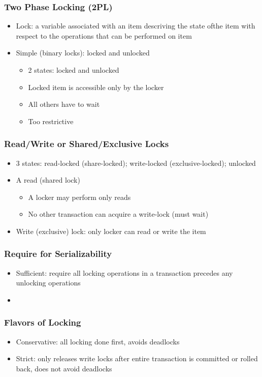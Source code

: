 \documentclass[12pt]{article}
\begin{document}
		\subsubsection*{Two Phase Locking (2PL)}
		\begin{itemize}
			\item
				Lock: a variable associated with an item descriving the state ofthe item with respect to the operations that can be performed on item
			\item
				Simple (binary locks): locked and unlocked
				\begin{itemize}
					\item
						2 states: locked and unlocked
					\item
						Locked item is accessible only by the locker
					\item
						All others have to wait
					\item
						Too restrictive
				\end{itemize}
		\end{itemize}
		\subsubsection*{Read/Write or Shared/Exclusive Locks}
		\begin{itemize}
			\item
				3 states: read-locked (share-locked); write-locked (exclusive-locked); unlocked
			\item
				A read (shared lock)
				\begin{itemize}
					\item
						A locker may perform only reads
					\item
						No other transaction can acquire a write-lock (must wait)
				\end{itemize}
			\item
				Write (exclusive) lock: only locker can read or write the item
		\end{itemize}
		\subsubsection*{Require for Serializability}
		\begin{itemize}
			\item
				Sufficient: require all locking operations in a transaction precedes any unlocking operations
			\item

		\end{itemize}
		\subsubsection*{Flavors of Locking}
		\begin{itemize}
			\item
				Conservative: all locking done first, avoids deadlocks
			\item
				Strict: only releases write locks after entire transaction is committed or rolled back, does not avoid deadlocks
		\end{itemize}
\end{document}
